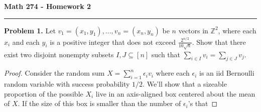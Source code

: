 \documentclass[11pt,letterpaper]{report}
\newcommand{\integers}{\mathbb{Z}}
\begin{document}
\begin{center}
{\bf \Large Math 274 - Homework 2}
\vspace{0.2cm}
\hrule
\end{center}

\noindent\textbf{Problem 1. }
Let $v_1 = (x_1, y_1), \ldots, v_n = (x_n, y_n)$ be $n$ vectors in $\integers^2$, where each $x_i$ and each $y_i$ is a positive integer that does not exceed $\frac{2^{n/2}}{10\sqrt{n}}$.
Show that there exist two disjoint nonempty subsets $I, J\subseteq [n]$ such that $\sum_{i\in I}v_i = \sum_{j\in J}v_j$.

\begin{proof}
    Consider the random sum $X = \sum_{i=1}^n \epsilon_iv_i$ where each $\epsilon_i$ is an iid Bernoulli random variable with success probability $1/2$.
    We'll show that a sizeable proportion of the possible $X_i$ live in an axis-aligned box centered about the mean of $X$.
    If the size of this box is smaller than the number of $\epsilon_i$'s that 
\end{proof}
\end{document}
